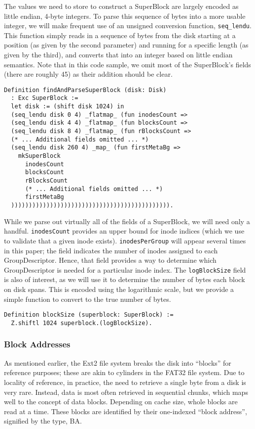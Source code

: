 \documentclass[nocopyrightspace]{sigplanconf}
\begin{document}
The values we need to store to construct a SuperBlock are largely encoded as
little endian, 4-byte integers. To parse this sequence of bytes into a more
usable integer, we will make frequent use of an unsigned conversion function,
{\tt seq\_lendu}. This function simply reads in a sequence of bytes from the
disk starting at a position (as given by the second parameter) and running for
a specific length (as given by the third), and converts that into an integer
based on little endian semantics. Note that in this code sample, we omit most
of the SuperBlock's fields (there are roughly 45) as their addition should be
clear.

\begin{lstlisting}
Definition findAndParseSuperBlock (disk: Disk)
  : Exc SuperBlock :=
  let disk := (shift disk 1024) in
  (seq_lendu disk 0 4) _flatmap_ (fun inodesCount =>
  (seq_lendu disk 4 4) _flatmap_ (fun blocksCount =>
  (seq_lendu disk 8 4) _flatmap_ (fun rBlocksCount =>
  (* ... Additional fields omitted ... *)
  (seq_lendu disk 260 4) _map_ (fun firstMetaBg =>
    mkSuperBlock
      inodesCount
      blocksCount
      rBlocksCount
      (* ... Additional fields omitted ... *)
      firstMetaBg
  ))))))))))))))))))))))))))))))))))))))))))))).
\end{lstlisting}

While we parse out virtually all of the fields of a SuperBlock, we will need
only a handful. {\tt inodesCount} provides an upper bound for inode indices
(which we use to validate that a given inode exists). {\tt inodesPerGroup}
will appear several times in this paper; the field indicates the number of
inodes assigned to each GroupDescriptor. Hence, that field provides a way to
determine which GroupDescriptor is needed for a particular inode index. The
{\tt logBlockSize} field is also of interest, as we will use it to determine
the number of bytes each block on disk spans. This is encoded using the
logarithmic scale, but we provide a simple function to convert to the true
number of bytes.

\begin{lstlisting}
Definition blockSize (superblock: SuperBlock) := 
  Z.shiftl 1024 superblock.(logBlockSize).
\end{lstlisting}

\subsubsection{Block Addresses}

As mentioned earlier, the Ext2 file system breaks the disk into ``blocks'' for
reference purposes; these are akin to cylinders in the FAT32 file system. Due
to locality of reference, in practice, the need to retrieve a single byte from
a disk is very rare. Instead, data is most often retrieved in sequential
chunks, which maps well to the concept of data blocks.  Depending on cache
size, whole blocks are read at a time. These blocks are identified by their
one-indexed ``block address'', signified by the type, BA. 
\end{document}
